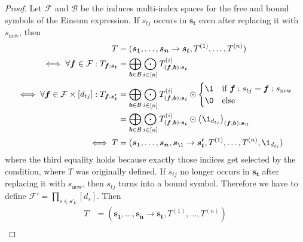 \begin{proof}
    \small
    Let $\mathcal{F}$ and $\mathcal{B}$ be the induces multi-index spaces for the free and bound symbols of the Einsum expression.
    If $s_{tj}$ occurs in $\bm{s_t}$ even after replacing it with $s_{\text{new}}$, then
    \begin{align*}
        T                                                                         & = (\bm{s_1}, \dots, \bm{s_n} \rightarrow \bm{s_t}, T^{(1)}, \dots, T^{(n)})                                                                                             \\
        \iff \forall \bm{f} \in \mathcal{F}: T_{\bm{f}:\bm{s_t}}                  & = \bigoplus\limits_{\bm{b} \in \mathcal{B}} \bigodot\limits_{i \in [n]} T^{(i)}_{(\bm{f}, \bm{b}):\bm{s_i}}                                                             \\
        \iff \forall \bm{f} \in \mathcal{F} \times [d_{tj}]: T_{\bm{f}:\bm{s'_t}} & = \bigoplus\limits_{\bm{b} \in \mathcal{B}} \bigodot\limits_{i \in [n]} T^{(i)}_{(\bm{f}, \bm{b}):\bm{s_i}} \odot \begin{cases}
            \1 & \text{if $\bm{f}: s_{tj} = \bm{f}: s_{\text{new}}$} \\
            \0 & \text{else}
        \end{cases}                             \\
                                                                                  & = \bigoplus\limits_{\bm{b} \in \mathcal{B}} \bigodot\limits_{i \in [n]} T^{(i)}_{(\bm{f}, \bm{b}):\bm{s_i}} \odot \left(\1_{d_{tj}}\right)_{(\bm{f}, \bm{b}):\bm{s_\1}} \\
        \iff T                                                                    & = (\bm{s_1}, \dots, \bm{s_n}, \bm{s_\1} \rightarrow \bm{s'_t}, T^{(1)}, \dots, T^{(n)}, \1_{d_{tj}})
    \end{align*}
    where the third equality holds because exactly those indices get selected by the condition, where $T$ was originally defined.
    If $s_{tj}$ no longer occurs in $\bm{s_t}$ after replacing it with $s_{\text{new}}$, then $s_{tj}$ turns into a bound symbol.
    Therefore we have to define $\mathcal{F}' = \prod_{s \in \bm{s'_t}} [d_s]$.
    Then
    \begin{align*}
        T                                                          & = (\bm{s_1}, \dots, \bm{s_n} \rightarrow \bm{s_t}, T^{(1)}, \dots, T^{(n)})                                                                                                             \\

\end{align*}
\end{proof}
